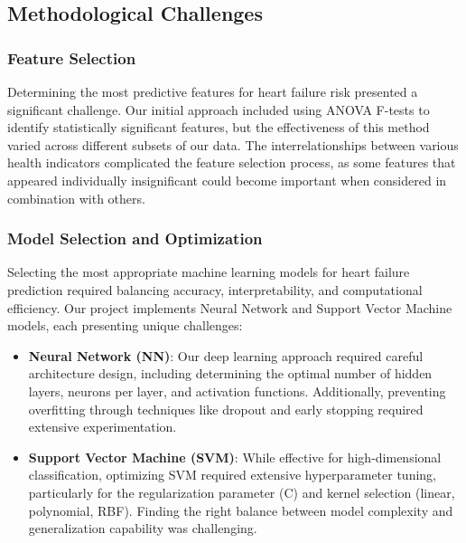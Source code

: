 \documentclass[11pt,a4paper]{article}
\newcommand{\greencheck}{\textcolor{green}{\ding{52}}}
\begin{document}
\subsection{Methodological Challenges}

\subsubsection{Feature Selection}
\vspace{-0.25cm}
Determining the most predictive features for heart failure risk presented a significant challenge. Our initial approach included using ANOVA F-tests to identify statistically significant features, but the effectiveness of this method varied across different subsets of our data. The interrelationships between various health indicators complicated the feature selection process, as some features that appeared individually insignificant could become important when considered in combination with others.

\subsubsection{Model Selection and Optimization}
\vspace{-0.25cm}
Selecting the most appropriate machine learning models for heart failure prediction required balancing accuracy, interpretability, and computational efficiency. Our project implements Neural Network and Support Vector Machine models, each presenting unique challenges:

\begin{itemize}
    \item \textbf{\greencheck \space Neural Network (NN)}: Our deep learning approach required careful architecture design, including determining the optimal number of hidden layers, neurons per layer, and activation functions. Additionally, preventing overfitting through techniques like dropout and early stopping required extensive experimentation.

    \item \textbf{\greencheck \space Support Vector Machine (SVM)}: While effective for high-dimensional classification, optimizing SVM required extensive hyperparameter tuning, particularly for the regularization parameter (C) and kernel selection (linear, polynomial, RBF). Finding the right balance between model complexity and generalization capability was challenging.
\end{itemize}
\end{document}

